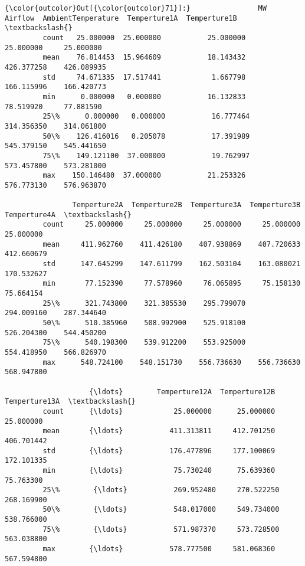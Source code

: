 \documentclass[11pt]{article}
\begin{document}
\begin{Verbatim}[commandchars=\\\{\}]
{\color{outcolor}Out[{\color{outcolor}71}]:}                MW    Airflow  AmbientTemperature  Temperture1A  Temperture1B  \textbackslash{}
         count   25.000000  25.000000           25.000000     25.000000     25.000000   
         mean    76.814453  15.964609           18.143432    426.377258    426.089935   
         std     74.671335  17.517441            1.667798    166.115996    166.420773   
         min      0.000000   0.000000           16.132833     78.519920     77.881590   
         25\%      0.000000   0.000000           16.777464    314.356350    314.061800   
         50\%    126.416016   0.205078           17.391989    545.379150    545.441650   
         75\%    149.121100  37.000000           19.762997    573.457800    573.281000   
         max    150.146480  37.000000           21.253326    576.773130    576.963870   
         
                Temperture2A  Temperture2B  Temperture3A  Temperture3B  Temperture4A  \textbackslash{}
         count     25.000000     25.000000     25.000000     25.000000     25.000000   
         mean     411.962760    411.426180    407.938869    407.720633    412.660679   
         std      147.645299    147.611799    162.503104    163.080021    170.532627   
         min       77.152390     77.578960     76.065895     75.158130     75.664154   
         25\%      321.743800    321.385530    295.799070    294.009160    287.344640   
         50\%      510.385960    508.992900    525.918100    526.204300    544.450200   
         75\%      540.198300    539.912200    553.925000    554.418950    566.826970   
         max      548.724100    548.151730    556.736630    556.736630    568.947800   
         
                    {\ldots}        Temperture12A  Temperture12B  Temperture13A  \textbackslash{}
         count      {\ldots}            25.000000      25.000000      25.000000   
         mean       {\ldots}           411.313811     412.701250     406.701442   
         std        {\ldots}           176.477896     177.100069     172.101335   
         min        {\ldots}            75.730240      75.639360      75.763300   
         25\%        {\ldots}           269.952480     270.522250     268.169900   
         50\%        {\ldots}           548.017000     549.734000     538.766000   
         75\%        {\ldots}           571.987370     573.728500     563.038800   
         max        {\ldots}           578.777500     581.068360     567.594800   
         

\end{Verbatim}
\end{document}
